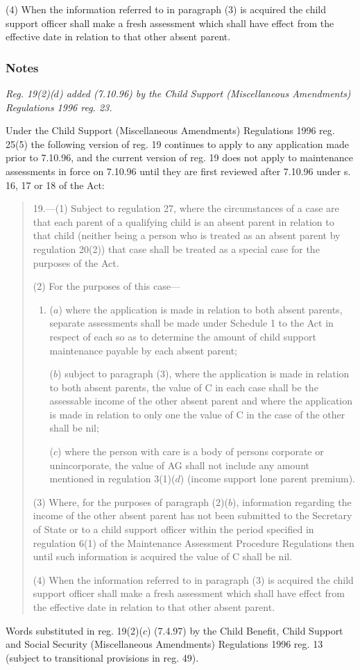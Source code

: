 \documentclass[a4paper]{article}
\newcommand\amendment[1]{\subsubsection*{Notes}{\itshape\frenchspacing\footnotesize #1 \par\goodbreak}}
\begin{document}
(4) When the information referred to in paragraph (3) is acquired the child support officer shall make a fresh assessment which shall have effect from the effective date in relation to that other absent parent.

\amendment{
Reg. 19(2)($d$) added (7.10.96) by the Child Support (Miscellaneous Amendments) Regulations 1996 reg. 23.

Under the Child Support (Miscellaneous Amendments) Regulations 1996 reg. 25(5) the following version of reg. 19 continues to apply to any application made prior to 7.10.96, and the current version of reg. 19 does not apply to maintenance assessments in force on 7.10.96 until they are first reviewed after 7.10.96 under s. 16, 17 or 18 of the Act:

\begin{quotation}
19.—(1) Subject to regulation 27, where the circumstances of a case are that each parent of a qualifying child is an absent parent in relation to that child (neither being a person who is treated as an absent parent by regulation 20(2)) that case shall be treated as a special case for the purposes of the Act.

(2) For the purposes of this case—
\begin{enumerate}\item[]
($a$) where the application is made in relation to both absent parents, separate assessments shall be made under Schedule 1 to the Act in respect of each so as to determine the amount of child support maintenance payable by each absent parent;

($b$) subject to paragraph (3), where the application is made in relation to both absent parents, the value of C in each case shall be the assessable income of the other absent parent and where the application is made in relation to only one the value of C in the case of the other shall be nil;

($c$) where the person with care is a body of persons corporate or unincorporate, the value of AG shall 
not include any amount mentioned in regulation 3(1)($d$) (income support lone parent premium).
\end{enumerate}

(3) Where, for the purposes of paragraph (2)($b$), information regarding the income of the other absent parent has not been submitted to the Secretary of State or to a child support officer within the period specified in regulation 6(1) of the Maintenance Assessment Procedure Regulations then until such information is acquired the value of C shall be nil.

(4) When the information referred to in paragraph (3) is acquired the child support officer shall make a fresh assessment which shall have effect from the effective date in relation to that other absent parent.
\end{quotation}

Words substituted in reg. 19(2)($c$) (7.4.97) by the Child Benefit, Child Support and Social Security (Miscellaneous Amendments) Regulations 1996 reg. 13 (subject to transitional provisions in reg. 49).
}
\end{document}
